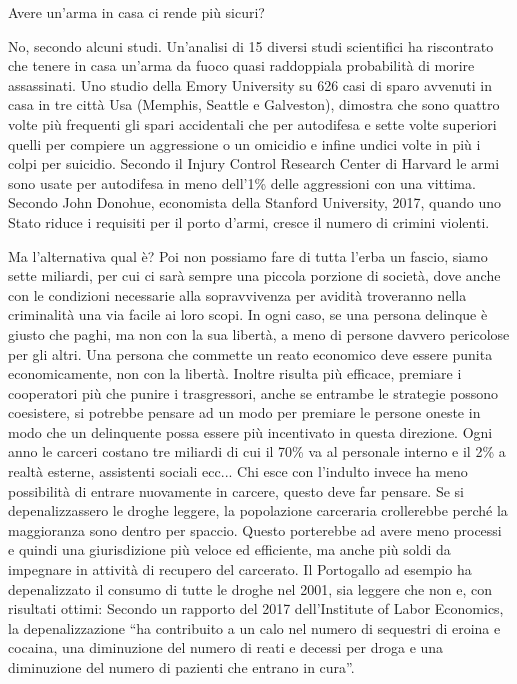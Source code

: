 \documentclass[12pt]{book} %
\begin{document}
\bigskip
\begin{mdframed}[linewidth=1pt]
Avere un'arma in casa ci rende più sicuri?

No, secondo alcuni studi. Un'analisi di 15 diversi studi scientifici ha riscontrato che tenere in casa un'arma da fuoco
quasi raddoppiala probabilità di morire assassinati. Uno studio della Emory
University su 626 casi di sparo avvenuti in casa in tre città Usa (Memphis, Seattle e Galveston), dimostra che sono quattro
volte più frequenti gli spari accidentali che per autodifesa e sette volte superiori quelli per compiere un aggressione
o un omicidio e infine undici volte in più i colpi per suicidio. Secondo il Injury Control Research Center di Harvard
le armi sono usate per autodifesa in meno dell'1\% delle aggressioni con una vittima. Secondo John Donohue, economista
della Stanford University, 2017, quando uno Stato riduce i requisiti per il porto d'armi, cresce il numero di crimini
violenti.
\end{mdframed}

\bigskip

Ma l'alternativa qual è? Poi non possiamo fare di tutta l'erba un fascio,
siamo sette miliardi, per cui ci sarà sempre una piccola porzione di società, dove anche con le condizioni necessarie
alla sopravvivenza per avidità troveranno nella criminalità una via facile ai loro scopi. In ogni caso, se una persona
delinque è giusto che paghi, ma non con la sua libertà, a meno di persone davvero pericolose per gli altri. Una persona
che commette un reato economico deve essere punita economicamente, non con la libertà. Inoltre risulta più efficace,
premiare i cooperatori più che punire i trasgressori, anche se entrambe le strategie possono coesistere, si potrebbe
pensare ad un modo per premiare le persone oneste in modo che un delinquente possa essere più incentivato in questa
direzione. Ogni anno le carceri costano tre miliardi di cui il 70\% va al personale interno e il 2\% a realtà esterne,
assistenti sociali ecc... Chi esce con l'indulto invece ha meno possibilità di entrare nuovamente in carcere, questo
deve far pensare. Se si depenalizzassero le droghe leggere, la popolazione carceraria crollerebbe perché la maggioranza
sono dentro per spaccio. Questo porterebbe ad avere meno processi e quindi una giurisdizione più veloce ed efficiente,
ma anche più soldi da impegnare in attività di recupero del carcerato. Il Portogallo ad esempio ha depenalizzato il
consumo di tutte le droghe nel 2001, sia leggere che non e, con risultati ottimi: Secondo un rapporto del 2017
dell'Institute of Labor
Economics, la depenalizzazione “ha contribuito a un calo nel numero di sequestri di eroina e cocaina, una diminuzione del
numero di reati e decessi per droga e una diminuzione del numero di pazienti che entrano in cura”. 
\end{document}
